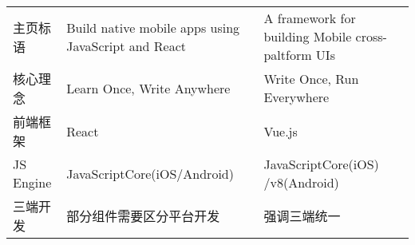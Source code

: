 \begin{longtable}[]{@{}lll@{}}
\begin{minipage}[t]{0.05\columnwidth}
主页标语\strut
\end{minipage} & \begin{minipage}[t]{0.05\columnwidth}\raggedright\strut
Build native mobile apps using JavaScript and React\strut
\end{minipage} & \begin{minipage}[t]{0.05\columnwidth}\raggedright\strut
A framework for building Mobile cross-paltform UIs\strut
\end{minipage}\tabularnewline
\begin{minipage}[t]{0.05\columnwidth}\raggedright\strut
核心理念\strut
\end{minipage} & \begin{minipage}[t]{0.05\columnwidth}\raggedright\strut
Learn Once, Write Anywhere\strut
\end{minipage} & \begin{minipage}[t]{0.05\columnwidth}\raggedright\strut
Write Once, Run Everywhere\strut
\end{minipage}\tabularnewline
\begin{minipage}[t]{0.05\columnwidth}\raggedright\strut
前端框架\strut
\end{minipage} & \begin{minipage}[t]{0.05\columnwidth}\raggedright\strut
React\strut
\end{minipage} & \begin{minipage}[t]{0.05\columnwidth}\raggedright\strut
Vue.js\strut
\end{minipage}\tabularnewline
\begin{minipage}[t]{0.05\columnwidth}\raggedright\strut
JS Engine\strut
\end{minipage} & \begin{minipage}[t]{0.05\columnwidth}\raggedright\strut
JavaScriptCore(iOS/Android)\strut
\end{minipage} & \begin{minipage}[t]{0.05\columnwidth}\raggedright\strut
JavaScriptCore(iOS) /v8(Android)\strut
\end{minipage}\tabularnewline
\begin{minipage}[t]{0.05\columnwidth}\raggedright\strut
三端开发\strut
\end{minipage} & \begin{minipage}[t]{0.05\columnwidth}\raggedright\strut
部分组件需要区分平台开发\strut
\end{minipage} & \begin{minipage}[t]{0.05\columnwidth}\raggedright\strut
强调三端统一\strut
\end{minipage}\tabularnewline

\end{longtable}
